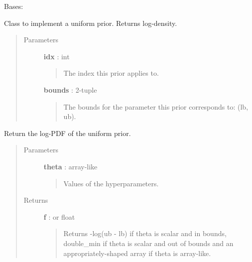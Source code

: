 \documentclass[letterpaper,10pt,english]{sphinxmanual}
\begin{document}

\begin{fulllineitems}
\label{gptools:gptools.utils.UniformPrior}
Bases: 

Class to implement a uniform prior. Returns log-density.
\begin{quote}\begin{description}
\item[{Parameters}] \leavevmode
\textbf{idx} : int
\begin{quote}

The index this prior applies to.
\end{quote}

\textbf{bounds} : 2-tuple
\begin{quote}

The bounds for the parameter this prior corresponds to: (lb, ub).
\end{quote}

\end{description}\end{quote}

\begin{fulllineitems}
\label{gptools:gptools.utils.UniformPrior.__call__}
Return the log-PDF of the uniform prior.
\begin{quote}\begin{description}
\item[{Parameters}] \leavevmode
\textbf{theta} : array-like
\begin{quote}

Values of the hyperparameters.
\end{quote}

\item[{Returns}] \leavevmode
\textbf{f} :  or float
\begin{quote}

Returns -log(ub - lb) if theta is scalar and in bounds, double\_min
if theta is scalar and out of bounds and an appropriately-shaped
array if theta is array-like.
\end{quote}

\end{description}\end{quote}


\end{fulllineitems}
\end{fulllineitems}
\end{document}
